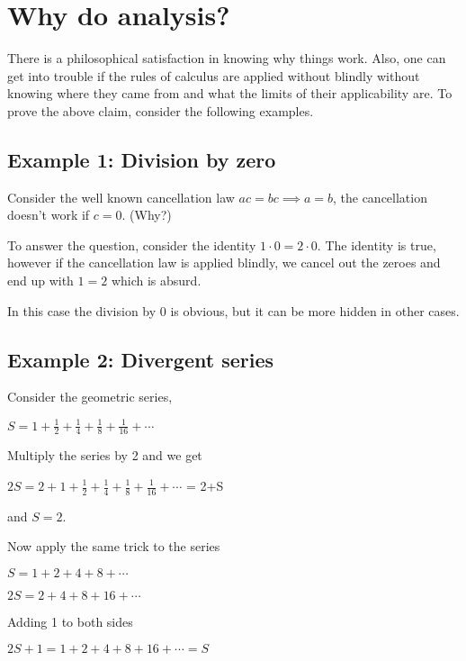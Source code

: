 \documentclass[10pt]{article}
\begin{document}
\section*{Why do analysis?}
There is a philosophical satisfaction in knowing why things work. Also, one can
get into trouble if the rules of calculus are applied without blindly without
knowing where they came from and what the limits of their applicability are.
\break
To prove the above claim, consider the following examples.

\subsection*{Example 1: Division by zero}
Consider the well known cancellation law \( ac = bc \implies a = b \), the
cancellation doesn't work if \( c = 0 \). (Why?)

To answer the question, consider the identity \( 1 \cdot 0 = 2 \cdot 0 \). The
identity is true, however if the cancellation law is applied blindly, we cancel
out the zeroes and end up with \( 1 = 2 \) which is absurd.

In this case the division by 0 is obvious, but it can be more hidden in other
cases.

\subsection*{Example 2: Divergent series}
Consider the geometric series,

\begin{center}
  \( S = 1 + \frac{1}{2} + \frac{1}{4} + \frac{1}{8} + \frac{1}{16} + \cdots \)
\end{center}

Multiply the series by 2 and we get

\begin{center}
  \( 2S = 2 + 1 + \frac{1}{2}+\frac{1}{4}+\frac{1}{8}+\frac{1}{16} + \cdots \) =
  2+S
\end{center}
and \( S = 2 \).

\break
Now apply the same trick to the series

\begin{center}
  \( S = 1 + 2 + 4 + 8 + \cdots \)

  \( 2S = 2 + 4 + 8 + 16 + \cdots \)
\end{center}

Adding 1 to both sides
\begin{center}
  \( 2S + 1 = 1 + 2 + 4 + 8 + 16 + \cdots = S \)
\end{center}
\end{document}
